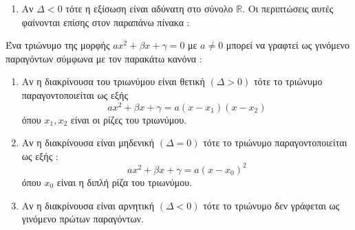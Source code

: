 \documentclass[twoside,nofonts,internet,shmeiwseis]{thewria}
\begin{document}
\begin{enumerate}[itemsep=0mm,start=3]
\item Αν $ \varDelta<0 $ τότε η εξίσωση είναι αδύνατη στο σύνολο $ \mathbb{R} $. Οι περιπτώσεις αυτές φαίνονται επίσης στον παραπάνω πίνακα :
\end{enumerate}
Ένα τριώνυμο της μορφής $ ax^2+\beta x+\gamma=0 $ με $ a\neq0 $ μπορεί να γραφτεί ως γινόμενο παραγόντων σύμφωνα με τον παρακάτω κανόνα :
\begin{enumerate}[itemsep=0mm]
\item Αν η διακρίνουσα του τριωνύμου είναι θετική $\left( \varDelta>0\right)  $ τότε το τριώνυμο παραγοντοποιείται ως εξής \[ ax^2+\beta x+\gamma=a(x-x_1)(x-x_2) \]
όπου $ x_1,x_2 $ είναι οι ρίζες του τριωνύμου.
\item Αν η διακρίνουσα είναι μηδενική $\left( \varDelta=0\right)  $ τότε το τριώνυμο παραγοντοποιείται ως εξής : \[ ax^2+\beta x+\gamma=a\left(x-x_0\right)^2  \]
όπου $ x_0 $ είναι η διπλή ρίζα του τριωνύμου.
\item Αν η διακρίνουσα είναι αρνητική $\left( \varDelta<0\right)  $ τότε το τριώνυμο δεν γράφεται ως γινόμενο πρώτων παραγόντων.
\end{enumerate}
\end{document}
